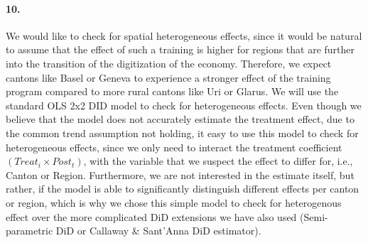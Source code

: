 \documentclass{scrartcl}
\begin{document}
\paragraph*{10.}

We would like to check for spatial heterogeneous effects, since it would be natural to assume that the effect of such a training is higher for regions that are further into the transition of the digitization of the economy. Therefore, we expect cantons like Basel or Geneva to experience a stronger effect of the training program compared to more rural cantons like Uri or Glarus. We will use the standard OLS 2x2 DID model to check for heterogeneous effects. Even though we believe that the model does not accurately estimate the treatment effect, due to the common trend assumption not holding, it easy to use this model to check for heterogeneous effects, since we only need to interact the treatment coefficient $(Treat_i  \times Post_t)$, with the variable that we suspect the effect to differ for, i.e., Canton or Region. Furthermore, we are not interested in the estimate itself, but rather, if the model is able to significantly distinguish different effects per canton or region, which is why we chose this simple model to check for heterogenous effect over the more complicated DiD extensions we have also used (Semi-parametric DiD or Callaway \& Sant'Anna DiD estimator).
\end{document}
